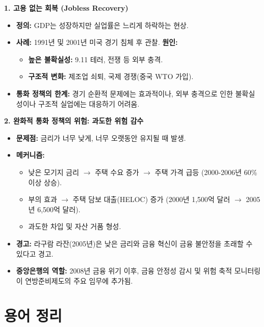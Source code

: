 \documentclass[11pt,a4paper]{book}
\theoremstyle{definition}
\begin{document}
\begin{summarybox}[title={통화 정책의 한계: 1페이지 요약}]
\textbf{1. 고용 없는 회복 (Jobless Recovery)}
\begin{itemize}
    \item \textbf{정의:} GDP는 성장하지만 실업률은 느리게 하락하는 현상.
    \item \textbf{사례:} 1991년 및 2001년 미국 경기 침체 후 관찰.
    \textbf{원인:}
    \begin{itemize}
        \item \textbf{높은 불확실성:} 9.11 테러, 전쟁 등 외부 충격.
        \item \textbf{구조적 변화:} 제조업 쇠퇴, 국제 경쟁(중국 WTO 가입).
    \end{itemize}
    \item \textbf{통화 정책의 한계:} 경기 순환적 문제에는 효과적이나, 외부 충격으로 인한 불확실성이나 구조적 실업에는 대응하기 어려움.
\end{itemize}

\textbf{2. 완화적 통화 정책의 위험: 과도한 위험 감수}
\begin{itemize}
    \item \textbf{문제점:} 금리가 너무 낮게, 너무 오랫동안 유지될 때 발생.
    \item \textbf{메커니즘:}
    \begin{itemize}
        \item 낮은 모기지 금리 $\rightarrow$ 주택 수요 증가 $\rightarrow$ 주택 가격 급등 (2000-2006년 60\% 이상 상승).
        \item 부의 효과 $\rightarrow$ 주택 담보 대출(HELOC) 증가 (2000년 1,500억 달러 $\rightarrow$ 2005년 6,500억 달러).
        \item 과도한 차입 및 자산 거품 형성.
    \end{itemize}
    \item \textbf{경고:} 라구람 라잔(2005년)은 낮은 금리와 금융 혁신이 금융 불안정을 초래할 수 있다고 경고.
    \item \textbf{중앙은행의 역할:} 2008년 금융 위기 이후, 금융 안정성 감시 및 위험 축적 모니터링이 연방준비제도의 주요 임무에 추가됨.
\end{itemize}
\end{summarybox}


\chapter{용어 정리}
\label{ch:module8}
\end{document}
